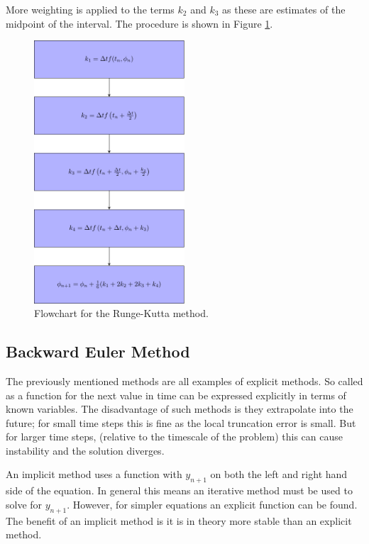 \documentclass[../Interim_Report_Master]{subfiles}
\begin{document}
More weighting is applied to the terms $k_2$ and $k_3$ as these are estimates of the midpoint of the interval. The procedure is shown in Figure \ref{runge_kutta}.
\begin{figure}
	\centering
	\includegraphics[width=0.5\textwidth]{./Diagrams/Runge_Kutta_Method_Flowchart/Runge_Kutta_Method_Flowchart.pdf}
	\caption{Flowchart for the Runge-Kutta method.}
	\label{runge_kutta}
\end{figure}

\subsection{Backward Euler Method}
The previously mentioned methods are all examples of explicit methods. So called as a function for the next value in time can be expressed explicitly in terms of known variables. The disadvantage of such methods is they extrapolate into the future; for small time steps this is fine as the local truncation error is small. But for larger time steps, (relative to the timescale of the problem) this can cause instability and the solution diverges. 

An implicit method uses a function with $y_{n+1}$ on both the left and right hand side of the equation. In general this means an iterative method must be used to solve for $y_{n+1}$. However, for simpler equations an explicit function can be found. The benefit of an implicit method is it is in theory more stable than an explicit method.
\end{document}

